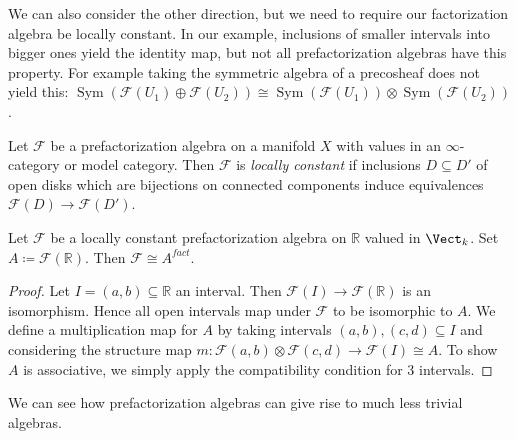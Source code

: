 We can also consider the other direction, but we need to require our factorization algebra be locally constant. In our example, inclusions of smaller intervals into bigger ones yield the identity map, but not all prefactorization algebras have this property. For example taking the symmetric algebra of a precosheaf does not yield this: $\operatorname{Sym} (\mathcal{F} (U_1)\oplus \mathcal{F} (U_2))\cong \operatorname{Sym} (\mathcal{F} (U_1))\otimes \operatorname{Sym} (\mathcal{F} (U_2))$.

\begin{definition}\label{3.1.3}
	Let $\mathcal{F} $ be a prefactorization algebra on a manifold $X$ with values in an $\infty $-category or model category. Then $\mathcal{F} $ is \emph{locally constant} if inclusions $D\subseteq D'$ of open disks which are bijections on connected components induce equivalences $\mathcal{F} (D)\to \mathcal{F} (D')$.
\end{definition}

\begin{lemma}\label{3.1.4}
	Let $\mathcal{F} $ be a locally constant prefactorization algebra on $\mathbb{R} $ valued in $\Vect_{k} $. Set $A\coloneqq \mathcal{F} (\mathbb{R} )$. Then $\mathcal{F} \cong A^{fact} $.
\end{lemma}
\begin{proof}
	Let $I=(a,b)\subseteq \mathbb{R} $ an interval. Then $\mathcal{F} (I)\to \mathcal{F} (\mathbb{R} )$ is an isomorphism. Hence all open intervals map under $\mathcal{F} $ to be isomorphic to $A$. We define a multiplication map for $A$ by taking intervals $(a,b),(c,d)\subseteq I$ and considering the structure map $m : \mathcal{F} (a,b)\otimes \mathcal{F} (c,d) \to \mathcal{F} (I)\cong A$. To show $A$ is associative, we simply apply the compatibility condition for 3 intervals.
\end{proof}

We can see how prefactorization algebras can give rise to much less trivial algebras.

